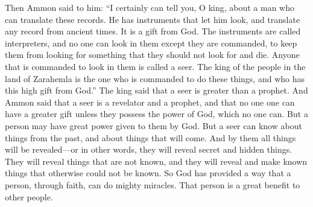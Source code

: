 Then Ammon said to him: ``I certainly can tell you, O king, about a man who can translate these records. He has instruments that let him look, and translate any record from ancient times. It is a gift from God. The instruments are called interpreters, and no one can look in them except they are commanded, to keep them from looking for something that they should not look for and die. Anyone that is commanded to look in them is called a seer.
\bverse \iffalse And behold, the king of the people who are in the land of Zarahemla is the man that is commanded to do these things, and who has this high gift from God. \fi
The king of the people in the land of Zarahemla is the one who is commanded to do these things, and who has this high gift from God.''
\bverse \iffalse And the king said that a seer is greater than a prophet. \fi
The king said that a seer is greater than a prophet.
\bverse \iffalse And Ammon said that a seer is a revelator and a prophet also; and a gift which is greater can no man have, except he should possess the power of God, which no man can; yet a man may have great power given him from God. \fi
And Ammon said that a seer is a revelator and a prophet, and that no one one can have a greater gift unless they possess the power of God, which no one can. But a person may have great power given to them by God.
\bverse \iffalse But a seer can know of things which are past, and also of things which are to come, and by them shall all things be revealed, or, rather, shall secret things be made manifest, and hidden things shall come to light, and things which are not known shall be made known by them, and also things shall be made known by them which otherwise could not be known. \fi
But a seer can know about things from the past, and about things that will come. And by them all things will be revealed---or in other words, they will reveal secret and hidden things. They will reveal things that are not known, and they will reveal and make known things that otherwise could not be known.
\bverse \iffalse Thus God has provided a means that man, through faith, might work mighty miracles; therefore he becometh a great benefit to his fellow beings. \fi
So God has provided a way that a person, through faith, can do mighty miracles. That person is a great benefit to other people.
\bverse \iffalse And now, when Ammon had made an end of speaking these words the king rejoiced exceedingly, and gave thanks to God, saying: Doubtless a great mystery is contained within these plates, and these interpreters were doubtless prepared for the purpose of unfolding all such mysteries to the children of men. \fi
